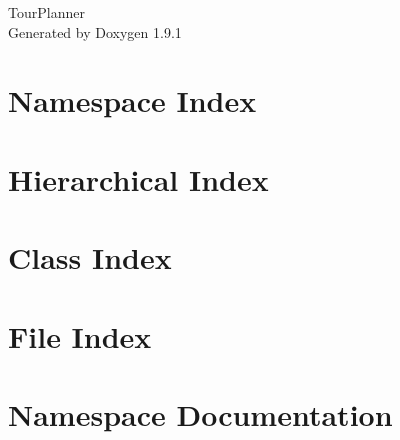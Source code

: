\let\mypdfximage\pdfximage\def\pdfximage{\immediate\mypdfximage}\documentclass[twoside]{book}
\newcommand{\+}{\discretionary{\mbox{\scriptsize$\hookleftarrow$}}{}{}}
\newcommand{\clearemptydoublepage}{%
  \newpage{\pagestyle{empty}\cleardoublepage}%
}
\begin{document}
\raggedbottom

\hypersetup{pageanchor=false,
             bookmarksnumbered=true,
             pdfencoding=unicode
            }
\begin{titlepage}
\vspace*{7cm}
\begin{center}%
{\Large Tour\+Planner }\\
\vspace*{1cm}
{\large Generated by Doxygen 1.9.1}\\
\end{center}
\end{titlepage}
\clearemptydoublepage
{}
\tableofcontents
\clearemptydoublepage
{}
\hypersetup{pageanchor=true}

\chapter{Namespace Index}

\chapter{Hierarchical Index}

\chapter{Class Index}

\chapter{File Index}

\chapter{Namespace Documentation}













\end{document}
